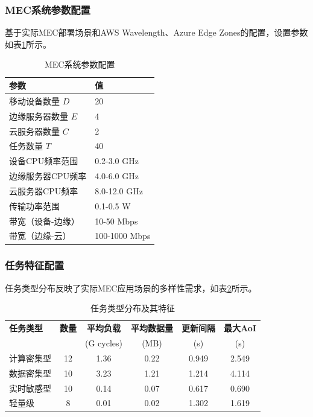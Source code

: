 \documentclass[conference]{IEEEtran}
\begin{document}
\subsubsection{MEC系统参数配置}
基于实际MEC部署场景和AWS Wavelength、Azure Edge Zones的配置，设置参数如表\ref{tab:system}所示。

\begin{table}[H]
\centering
\caption{MEC系统参数配置}
\label{tab:system}
\begin{tabular}{|l|l|}
\hline
\textbf{参数} & \textbf{值} \\
\hline
移动设备数量 $D$ & 20 \\
边缘服务器数量 $E$ & 4 \\
云服务器数量 $C$ & 2 \\
任务数量 $T$ & 40 \\
设备CPU频率范围 & 0.2-3.0 GHz \\
边缘服务器CPU频率 & 4.0-6.0 GHz \\
云服务器CPU频率 & 8.0-12.0 GHz \\
传输功率范围 & 0.1-0.5 W \\
带宽（设备-边缘） & 10-50 Mbps \\
带宽（边缘-云） & 100-1000 Mbps \\
\hline
\end{tabular}
\end{table}

\subsubsection{任务特征配置}
任务类型分布反映了实际MEC应用场景的多样性需求，如表\ref{tab:task}所示。

\begin{table}[H]
\centering
\caption{任务类型分布及其特征}
\label{tab:task}
\begin{tabular}{|l|c|c|c|c|c|}
\hline
\textbf{任务类型} & \textbf{数量} & \textbf{平均负载} & \textbf{平均数据量} & \textbf{更新间隔} & \textbf{最大AoI} \\
& & (G cycles) & (MB) & (s) & (s) \\
\hline
计算密集型 & 12 & 1.36 & 0.22 & 0.949 & 2.549 \\
数据密集型 & 10 & 3.23 & 1.21 & 1.214 & 4.114 \\
实时敏感型 & 10 & 0.14 & 0.07 & 0.617 & 0.690 \\
轻量级 & 8 & 0.01 & 0.02 & 1.302 & 1.619 \\
\hline
\end{tabular}
\end{table}
\end{document}
